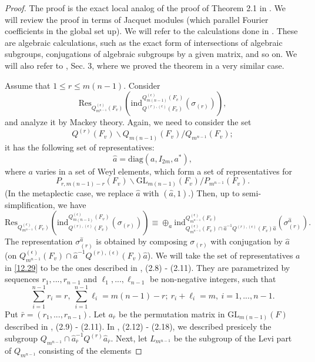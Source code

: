 \documentclass[12pts]{amsart}
\newcommand{\diag}{{\mathrm{diag}}}
\newcommand{\GL}{{\mathrm{GL}}}
\newcommand{\ind}{{\mathrm{ind}}}
\newcommand{\Res}{{\mathrm{Res}}}
\begin{document}
\begin{proof}
The proof is the exact local analog of the proof of Theorem 2.1 in \cite{GS18}. We will review the proof in terms of Jacquet modules (which parallel Fourier coefficients in the global set up). We will refer to the calculations done in \cite{GS18}. These are algebraic calculations, such as the exact form of intersections of algebraic subgroups, conjugations of algebraic subgroups by a given matrix, and so on. We will also refer to \cite{GJS15}, Sec. 3, where we proved the theorem in a very similar case. 

Assume that $1\leq r\leq m(n-1)$. Consider 
$$
\Res_{Q^{(\epsilon)}_{m^{n-1}}(F_v)}(\ind^{Q^{(\epsilon)}_{m(n-1)}(F_v)}_{Q^{(r),(\epsilon)}(F_v)}(\sigma_{(r)})),
$$
and analyze it by Mackey theory. Again, we need to consider the set
$$
Q^{(r)}(F_v)\backslash Q_{m(n-1)}(F_v)/ Q_{m^{n-1}}(F_v);
$$
it has the following set of representatives:
\begin{equation}\label{12.29}
\hat{a}=\diag(a,I_{2m},a^*),
\end{equation}
where $a$ varies in a set of Weyl elements, which form a set of
representatives for
$$
P_{r,m(n-1)-r}(F_v)\backslash\GL_{m(n-1)}(F_v)/P_{m^{n-1}}(F_v).
$$
(In the metaplectic case, we replace $\hat{a}$ with $(\hat{a},1)$.) Then, up to semi-simplification, we have
\begin{equation}\label{12.30}
\Res_{Q^{(\epsilon)}_{m^{n-1}}(F_v)}(\ind^{Q^{(\epsilon)}_{m(n-1)}(F_v)}_{Q^{(r),(\epsilon)}(F_v)}(\sigma_{(r)})) \equiv
\oplus_a\ind^{Q^{(\epsilon)}_{m^{n-1}}(F_v)}_{Q^{(\epsilon)}_{m^{n-1}}(F_v)\cap\hat{a}^{-1}Q^{(r),(\epsilon)}(F_v)\hat{a}}(\sigma_{(r)}^{\hat{a}}).
\end{equation}
The representation $\sigma_{(r)}^{\hat{a}}$ is obtained by composing
$\sigma_{(r)}$ with conjugation by $\hat{a}$ (on
${Q^{(\epsilon)}_{m^{n-1}}(F_v)}\cap\hat{a}^{-1}Q^{(r),(\epsilon)}(F_v)\hat{a}$). 
We will take the set of representatives $a$ in \eqref{12.29} to be the ones described in \cite{GS18}, (2.8) - (2.11). They are parametrized by sequences $r_1,...,r_{n-1}$ and
$\ell_1,...,\ell_{n-1}$ be non-negative integers, such that
\begin{equation}\label{12.31}
\sum_{i=1}^{n-1}r_i=r,\ \sum_{i=1}^{n-1}\ell_i=m(n-1)-r; \
r_i+\ell_i=m,\ i=1,...,n-1.
\end{equation}
Put $\bar{r}=(r_1,...,r_{n-1})$. Let $a_{\bar{r}}$ be the
permutation matrix in $\GL_{m(n-1)}(F)$ described in \cite{GS18}, (2.9) - (2.11). In \cite{GS18}, (2.12) - (2.18), we described presicely the subgroup $Q_{m^{n-1}}\cap \hat{a}_{\bar{r}}^{-1}Q^{(r)}\hat{a}_{\bar{r}}$. Next, let $L_{m^{n-1}}$ be the subgroup of the Levi part of $Q_{m^{n-1}}$ consisting of the elements

\end{proof}
\end{document}
